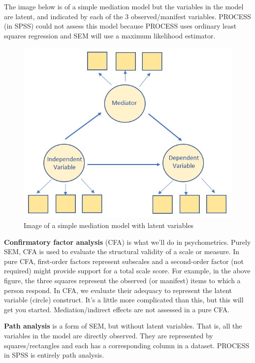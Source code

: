 \documentclass[
  11pt,
]{book}
\begin{document}
The image below is of a simple mediation model but the variables in the model are latent, and indicated by each of the 3 observed/manifest variables. PROCESS (in SPSS) could not assess this model because PROCESS uses ordinary least squares regression and SEM will use a maximum likelihood estimator.

\begin{figure}
\centering
\includegraphics{images/SimpleMod/SimpleMedLV.jpg}
\caption{Image of a simple mediation model with latent variables}
\end{figure}

\textbf{Confirmatory factor analysis} (CFA) is what we'll do in psychometrics. Purely SEM, CFA is used to evaluate the structural validity of a scale or measure. In pure CFA, first-order factors represent subscales and a second-order factor (not required) might provide support for a total scale score. For example, in the above figure, the three squares represent the observed (or manifest) items to which a person respond. In CFA, we evaluate their adequacy to represent the latent variable (circle) construct. It's a little more complicated than this, but this will get you started. Mediation/indirect effects are not assessed in a pure CFA.

\textbf{Path analysis} is a form of SEM, but without latent variables. That is, all the variables in the model are directly observed. They are represented by squares/rectangles and each has a corresponding column in a dataset. PROCESS in SPSS is entirely path analysis.
\end{document}
